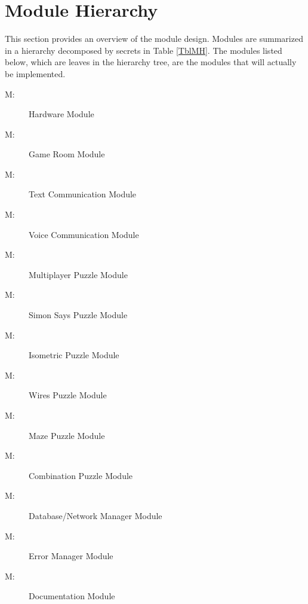\documentclass[12pt, titlepage]{article}
\newcounter{mnum}
\newcommand{\mthemnum}{M\themnum}
\begin{document}
\section{Module Hierarchy} \label{SecMH}

This section provides an overview of the module design. Modules are summarized
in a hierarchy decomposed by secrets in Table \ref{TblMH}. The modules listed
below, which are leaves in the hierarchy tree, are the modules that will
actually be implemented.

\begin{description}
\item [ \mthemnum \label{mHardware}:] Hardware Module

\item [ \mthemnum \label{mGameRoom}:] Game Room Module
\item [ \mthemnum \label{mText}:] Text Communication Module
\item [ \mthemnum \label{mVoice}:] Voice Communication Module
\item [ \mthemnum \label{mMultiplayerPuzzle}:] Multiplayer Puzzle Module

\item 
[ \mthemnum \label{mPSimon}:] Simon Says Puzzle Module
\item 
[ \mthemnum \label{mPIso}:] Isometric Puzzle Module
\item 
[ \mthemnum \label{mPWires}:] Wires Puzzle Module
\item 
[ \mthemnum \label{mPMaze}:] Maze Puzzle Module
\item 
[ \mthemnum \label{mPCombo}:] Combination Puzzle Module
\item [ \mthemnum \label{mDatabase}:] Database/Network Manager Module
\item [ \mthemnum \label{mErrorManager}:] Error Manager Module
\item [ \mthemnum \label{mDoc}:] Documentation Module
\end{description}
\end{document}
